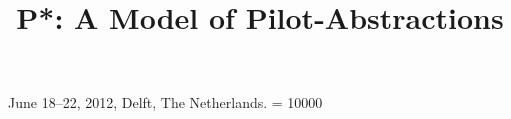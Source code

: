 \documentclass{sig-alternate}
\begin{document}

 {June 18--22, 2012, Delft, The Netherlands.} 
\widowpenalty = 10000





\title{P*: A Model of Pilot-Abstractions\up}
\end{document}
